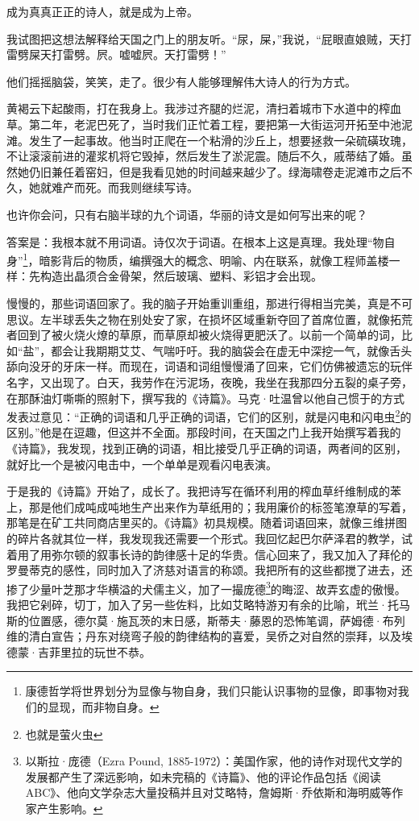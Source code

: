 \documentclass[AutoFakeBold=true]{book}
\begin{document}
成为真真正正的诗人，就是成为上帝。

\vspace*{1em}

我试图把这想法解释给天国之门上的朋友听。``尿，屎，''我说，``屁眼直娘贼，天打雷劈屎天打雷劈。屄。嘘嘘屄。天打雷劈！''

他们摇摇脑袋，笑笑，走了。很少有人能够理解伟大诗人的行为方式。

黄褐云下起酸雨，打在我身上。我涉过齐腿的烂泥，清扫着城市下水道中的榨血草。第二年，老泥巴死了，当时我们正忙着工程，要把第一大街运河开拓至中池泥滩。发生了一起事故。他当时正爬在一个粘滑的沙丘上，想要拯救一朵硫磺玫瑰，不让滚滚前进的灌浆机将它毁掉，然后发生了淤泥震。随后不久，戚蒂结了婚。虽然她仍旧兼任着窑妇，但是我看见她的时间越来越少了。绿海啸卷走泥滩市之后不久，她就难产而死。而我则继续写诗。

也许你会问，只有右脑半球的九个词语，华丽的诗文是如何写出来的呢？

答案是：我根本就不用词语。诗仅次于词语。在根本上这是真理。我处理``物自身''\footnote{康德哲学将世界划分为显像与物自身，我们只能认识事物的显像，即事物对我们的显现，而非物自身。}，暗影背后的物质，编撰强大的概念、明喻、内在联系，就像工程师盖楼一样：先构造出晶须合金骨架，然后玻璃、塑料、彩铝才会出现。

慢慢的，那些词语回家了。我的脑子开始重训重组，那进行得相当完美，真是不可思议。左半球丢失之物在别处安了家，在损坏区域重新夺回了首席位置，就像拓荒者回到了被火烧火燎的草原，而草原却被火烧得更肥沃了。以前一个简单的词，比如``盐''，都会让我期期艾艾、气喘吁吁。我的脑袋会在虚无中深挖一气，就像舌头舔向没牙的牙床一样。而现在，词语和词组慢慢涌了回来，它们仿佛被遗忘的玩伴名字，又出现了。白天，我劳作在污泥场，夜晚，我坐在我那四分五裂的桌子旁，在那酥油灯嘶嘶的照射下，撰写我的《诗篇》。马克·吐温曾以他自己惯于的方式发表过意见：``正确的词语和几乎正确的词语，它们的区别，就是闪电和闪电虫\footnote{也就是萤火虫}的区别。''他是在逗趣，但这并不全面。那段时间，在天国之门上我开始撰写着我的《诗篇》，我发现，找到正确的词语，相比接受几乎正确的词语，两者间的区别，就好比一个是被闪电击中，一个单单是观看闪电表演。

于是我的《诗篇》开始了，成长了。我把诗写在循环利用的榨血草纤维制成的苯上，那是他们成吨成吨地生产出来作为草纸用的；我用廉价的标签笔潦草的写着，那笔是在矿工共同商店里买的。《诗篇》初具规模。随着词语回来，就像三维拼图的碎片各就其位一样，我发现我还需要一个形式。我回忆起巴尔萨泽君的教学，试着用了用弥尔顿的叙事长诗的韵律感十足的华贵。信心回来了，我又加入了拜伦的罗曼蒂克的感性，同时加入了济慈对语言的称颂。我把所有的这些都搅了进去，还掺了少量叶芝那才华横溢的犬儒主义，加了一撮庞德\footnote{以斯拉·庞德（Ezra Pound, 1885-1972）：美国作家，他的诗作对现代文学的发展都产生了深远影响，如未完稿的《诗篇》、他的评论作品包括《阅读 ABC》、他向文学杂志大量投稿并且对艾略特，詹姆斯·乔依斯和海明威等作家产生影响。}的晦涩、故弄玄虚的傲慢。我把它剁碎，切丁，加入了另一些佐料，比如艾略特游刃有余的比喻，玳兰·托马斯的位置感，德尔莫·施瓦茨的末日感，斯蒂夫·藤恩的恐怖笔调，萨姆德·布列维的清白宣告；丹东对绕弯子般的韵律结构的喜爱，吴侨之对自然的崇拜，以及埃德蒙·吉菲里拉的玩世不恭。
\end{document}
